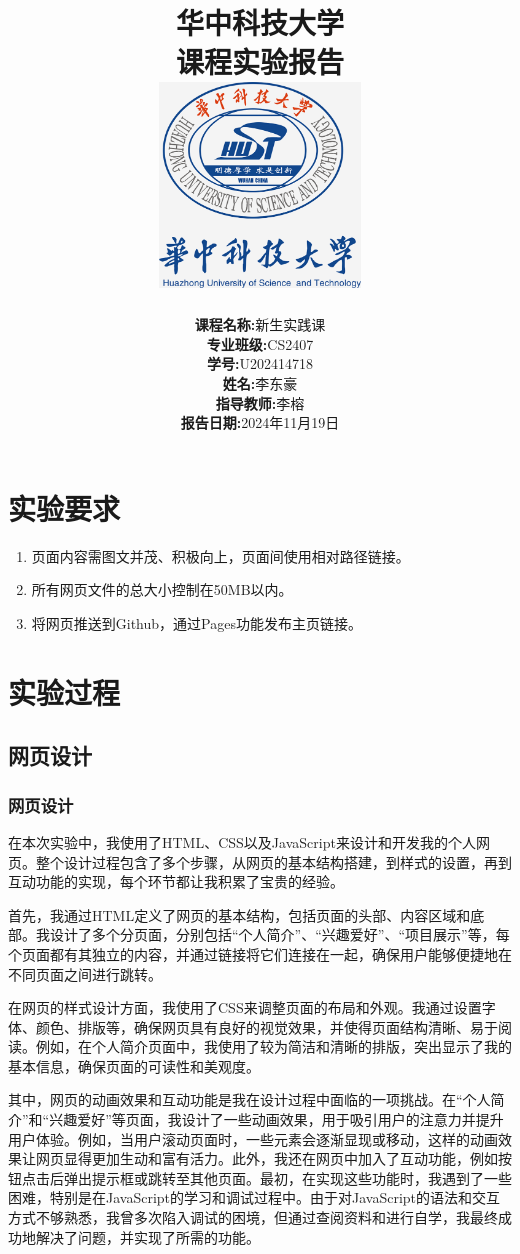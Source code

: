 \documentclass[a4paper,12pt]{article}
\title{
    \vspace{2cm}
    {\Huge \textbf{华中科技大学}} \\[0.5cm]
    {\LARGE 课程实验报告} \\[1cm]
    \includegraphics[width=0.4\textwidth]{logo.png} %
    \\[2cm]
}
\author{
    \begin{tabular}{rl}
        \textbf{课程名称:} & 新生实践课 \\
        \textbf{专业班级:} & CS2407 \\
        \textbf{学号:} & U202414718 \\
        \textbf{姓名:} & 李东豪 \\
        \textbf{指导教师:} & 李榕 \\
        \textbf{报告日期:} & 2024年11月19日 \\
    \end{tabular}
}
\date{}
\begin{document}
\maketitle
\thispagestyle{empty} %
\newpage

\tableofcontents
\newpage

\section{实验要求}
\begin{enumerate}
    \item 页面内容需图文并茂、积极向上，页面间使用相对路径链接。
    \item 所有网页文件的总大小控制在50MB以内。
    \item 将网页推送到Github，通过Pages功能发布主页链接。
\end{enumerate}

\section{实验过程}
\subsection{网页设计}
\subsubsection{网页设计}
在本次实验中，我使用了HTML、CSS以及JavaScript来设计和开发我的个人网页。整个设计过程包含了多个步骤，从网页的基本结构搭建，到样式的设置，再到互动功能的实现，每个环节都让我积累了宝贵的经验。

首先，我通过HTML定义了网页的基本结构，包括页面的头部、内容区域和底部。我设计了多个分页面，分别包括“个人简介”、“兴趣爱好”、“项目展示”等，每个页面都有其独立的内容，并通过链接将它们连接在一起，确保用户能够便捷地在不同页面之间进行跳转。

在网页的样式设计方面，我使用了CSS来调整页面的布局和外观。我通过设置字体、颜色、排版等，确保网页具有良好的视觉效果，并使得页面结构清晰、易于阅读。例如，在个人简介页面中，我使用了较为简洁和清晰的排版，突出显示了我的基本信息，确保页面的可读性和美观度。

其中，网页的动画效果和互动功能是我在设计过程中面临的一项挑战。在“个人简介”和“兴趣爱好”等页面，我设计了一些动画效果，用于吸引用户的注意力并提升用户体验。例如，当用户滚动页面时，一些元素会逐渐显现或移动，这样的动画效果让网页显得更加生动和富有活力。此外，我还在网页中加入了互动功能，例如按钮点击后弹出提示框或跳转至其他页面。最初，在实现这些功能时，我遇到了一些困难，特别是在JavaScript的学习和调试过程中。由于对JavaScript的语法和交互方式不够熟悉，我曾多次陷入调试的困境，但通过查阅资料和进行自学，我最终成功地解决了问题，并实现了所需的功能。
\end{document}
